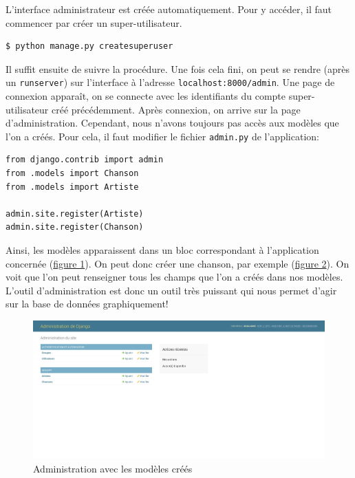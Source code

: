 \documentclass[a4paper, 10pt]{article}
\newcommand{\code}[1]{{\small\texttt{#1}}}
\begin{document}
L'interface administrateur est créée automatiquement. Pour y accéder, il faut commencer par créer un super-utilisateur.

\begin{verbatim}
$ python manage.py createsuperuser
\end{verbatim}

Il suffit ensuite de suivre la procédure. Une fois cela fini, on peut se rendre (après un \code{runserver}) sur l'interface à l'adresse \code{localhost:8000/admin}. Une page de connexion apparaît, on se connecte avec les identifiants du compte super-utilisateur créé précédemment. Après connexion, on arrive sur la page d'administration. Cependant, nous n'avons toujours pas accès aux modèles que l'on a créés. Pour cela, il faut modifier le fichier \code{admin.py} de l'application:
\begin{verbatim}
from django.contrib import admin
from .models import Chanson
from .models import Artiste

admin.site.register(Artiste)
admin.site.register(Chanson)
\end{verbatim}
Ainsi, les modèles apparaissent dans un bloc correspondant à l'application concernée (\hyperref[admin2]{figure 1}). On peut donc créer une chanson, par exemple (\hyperref[admin3]{figure 2}). On voit que l'on peut renseigner tous les champs que l'on a créés dans nos modèles. L'outil d’administration est donc un outil très puissant qui nous permet d'agir sur la base de données graphiquement!
\begin{figure}[h]
    \begin{center}
        \includegraphics[width=15 cm]{django/admin2.jpg}
        \caption{Administration avec les modèles créés}\label{admin2}
    \end{center}
\end{figure}
\end{document}
